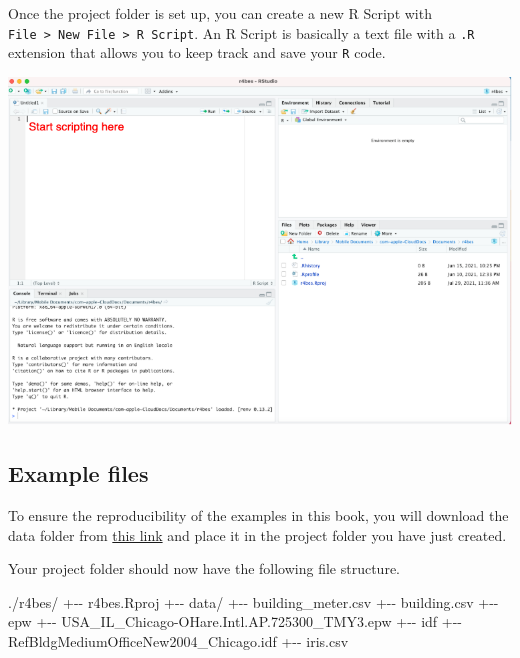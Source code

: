 \documentclass[
]{book}
\newenvironment{Shaded}{\begin{snugshade}}{\end{snugshade}}
\newcommand{\FloatTok}[1]{\textcolor[rgb]{0.00,0.00,0.81}{#1}}
\newcommand{\NormalTok}[1]{#1}
\newcommand{\SpecialCharTok}[1]{\textcolor[rgb]{0.00,0.00,0.00}{#1}}
\begin{document}
Once the project folder is set up, you can create a new R Script with \texttt{File\ \textgreater{}\ New\ File\ \textgreater{}\ R\ Script}. An R Script is basically a text file with a \texttt{.R} extension that allows you to keep track and save your \texttt{R} code.

\begin{center}\includegraphics[width=1\linewidth]{figures/script} \end{center}

\hypertarget{example-files}{%
\subsection*{Example files}\label{example-files}}

To ensure the reproducibility of the examples in this book, you will download the data folder from \href{https://www.dropbox.com/s/az2xh92pedhrzmk/data.zip?dl=0}{this link} and place it in the project folder you have just created.

Your project folder should now have the following file structure.

\begin{Shaded}
\begin{Highlighting}[]
\NormalTok{.}\SpecialCharTok{/}\NormalTok{r4bes}\SpecialCharTok{/}
  \SpecialCharTok{+{-}{-}}\NormalTok{ r4bes.Rproj}
  \SpecialCharTok{+{-}{-}}\NormalTok{ data}\SpecialCharTok{/}
      \SpecialCharTok{+{-}{-}}\NormalTok{ building\_meter.csv}
      \SpecialCharTok{+{-}{-}}\NormalTok{ building.csv}
      \SpecialCharTok{+{-}{-}}\NormalTok{ epw}
          \SpecialCharTok{+{-}{-}}\NormalTok{ USA\_IL\_Chicago}\SpecialCharTok{{-}}\NormalTok{OHare.Intl.AP}\FloatTok{.725300}\NormalTok{\_TMY3.epw}
      \SpecialCharTok{+{-}{-}}\NormalTok{ idf}
          \SpecialCharTok{+{-}{-}}\NormalTok{ RefBldgMediumOfficeNew2004\_Chicago.idf}
      \SpecialCharTok{+{-}{-}}\NormalTok{ iris.csv}
\end{Highlighting}
\end{Shaded}
\end{document}
